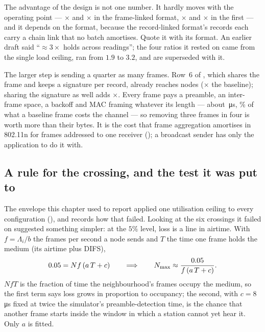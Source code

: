 \begin{remark}
The advantage of the design is not one number. It hardly moves with the operating point ---
\ratioLean$\times$ and \ratioRelLean$\times$ in the frame-linked format, \ratioFirst$\times$ and
\ratioRelFirst$\times$ in the first --- and it depends on the format, because the record-linked format's
records each carry a chain link that no batch amortises. Quote it with its format. An earlier
draft said ``$\approx 3\times$ holds across readings''; the four ratios it rested on came from
the single load ceiling, ran from $1.9$ to $3.2$, and are superseded with it.
\end{remark}

The larger step is sending a quarter as many frames. Row~6 of , which shares
the frame and keeps a signature per record, already reaches \nmaxLeanInline{} nodes
(\stepShareLean$\times$ the baseline); sharing the signature as well adds
\stepSignLean$\times$.
Every frame pays a preamble, an inter-frame space, a backoff and MAC framing whatever its length
--- about \fixedCost\,\si{\micro\second}, \fixedSharePct\% of what a baseline frame costs the
channel --- so removing three frames in four is worth more than their bytes. It is the cost
that frame aggregation amortises in 802.11n for frames addressed to one receiver
(); a broadcast sender has only the application to do it with.

\subsection{A rule for the crossing, and the test it was put to}\label{sec:line}

The envelope this chapter used to report applied one utilisation ceiling to every configuration
(), and  records how that failed. Looking at the
six crossings it failed on suggested something simpler: at the $5\%$ level, loss is a line in
airtime. With $f = \Lambda_i/b$ the frames per second a node sends and $T$ the time one frame
holds the medium (its airtime plus DIFS),
\begin{equation}
0.05 = N f\,(a\,T + c)
\qquad\Longrightarrow\qquad
N_{\max} \approx \frac{0.05}{f\,(a\,T + c)} .
\label{eq:line}
\end{equation}
$N f T$ is the fraction of time the neighbourhood's frames occupy the medium, so the first term
says loss grows in proportion to occupancy; the second, with $c = 8$\,\si{\micro\second}
fixed at twice the simulator's preamble-detection time, is the chance that another frame starts
inside the window in which a station cannot yet hear it. Only $a$ is fitted.

